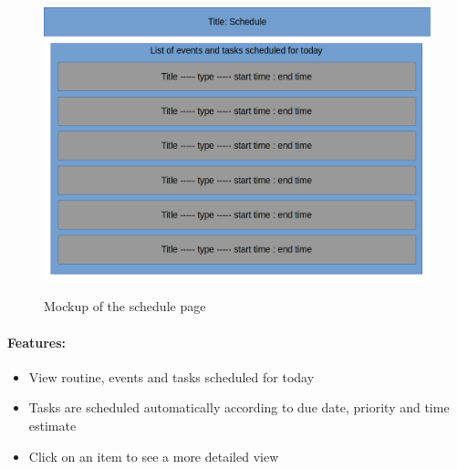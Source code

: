 \documentclass{article}
\begin{document}
\begin{minipage}{0.5\textwidth}
	\begin{figure}[H]
		\includegraphics[width=\linewidth]{Mockups/schedule.png}
		\label{fig:schedule_mockup}
		\caption{Mockup of the schedule page}
	\end{figure}
\end{minipage} \hfill
\begin{minipage}{0.45\textwidth}
	\paragraph{Features:}
	\begin{samepage}
		\begin{itemize}
			\item View routine, events and tasks scheduled for today
			\item Tasks are scheduled automatically according to due date, priority and time estimate
			\item Click on an item to see a more detailed view
		\end{itemize}
	\end{samepage}
\end{minipage}
\end{document}
